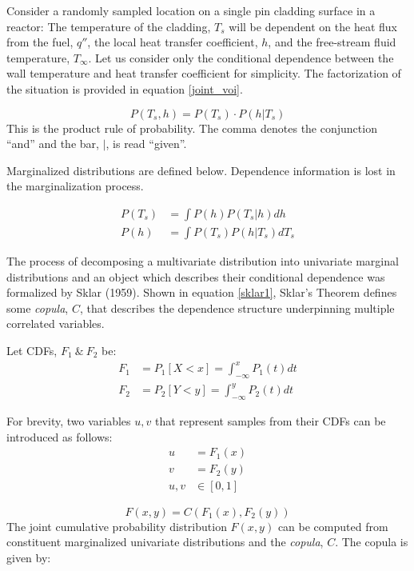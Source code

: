 \documentclass[10pt,a4paper]{report}
\begin{document}
Consider a randomly sampled location on a single pin cladding surface in a reactor:  The temperature of the cladding, $T_s$ will be dependent on the heat flux from the fuel, $q''$, the local heat transfer coefficient, $h$, and the free-stream fluid temperature, $T_{\infty}$.  Let us consider only the conditional dependence between the wall temperature and heat transfer coefficient for simplicity.  The factorization of the situation is provided in equation \ref{joint_voi}.

\begin{equation}
P(T_s, h) = P(T_s) \cdot P(h | T_s)
\label{joint_voi}
\end{equation}
This is the product rule of probability.  The comma denotes the conjunction ``and'' and the bar, $|$, is read ``given''.

Marginalized distributions are defined below. Dependence information is lost in the marginalization process.

\begin{align*}
P(T_s) &= \int P(h) P(T_s|h) dh \\
P(h) &= \int P(T_s) P(h|T_s) dT_s
\end{align*}

The process of decomposing a multivariate distribution into univariate marginal distributions and an object which describes their conditional dependence was formalized by Sklar (1959).  Shown in equation \ref{sklar1},  Sklar's Theorem defines some \emph{copula}, $C$, that describes the dependence structure underpinning multiple correlated variables.

Let CDFs, $F_1\ \&\ F_2$ be:
\begin{align*}
F_1 &= P_1[X < x] = \int_{-\infty}^x P_1(t)dt \\
F_2 &= P_2[Y < y] = \int_{-\infty}^y P_2(t)dt
\end{align*}

For brevity, two variables $u, v$ that represent samples from their CDFs can be introduced as follows:
\begin{align*}
u &= F_1(x) \\
v &= F_2(y) \\
u,v &\in [0, 1]
\end{align*}

\begin{equation}
F(x,y) = C(F_1(x), F_2(y))
\label{sklar1}
\end{equation}
The joint cumulative probability distribution $F(x,y)$ can be computed from constituent marginalized univariate distributions and the \emph{copula}, $C$.  The copula is given by:
\end{document}
